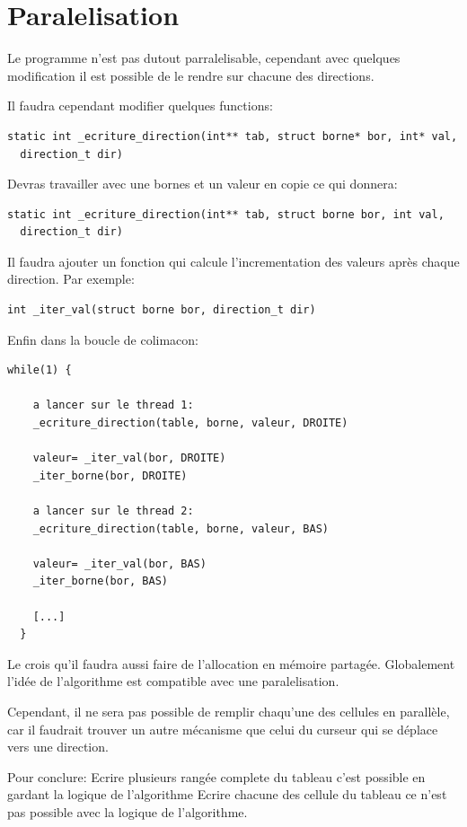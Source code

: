 \documentclass[a4paper]{article}
\begin{document}
\section{Paralelisation}

Le programme n'est pas dutout parralelisable, cependant avec quelques
modification il est possible de le rendre sur chacune des directions.

Il faudra cependant modifier quelques functions:
\begin{lstlisting}[frame=single]
static int _ecriture_direction(int** tab, struct borne* bor, int* val,
  direction_t dir)
\end{lstlisting}
Devras travailler avec une bornes et un valeur en copie ce qui donnera:
\begin{lstlisting}[frame=single]
static int _ecriture_direction(int** tab, struct borne bor, int val,
  direction_t dir)
\end{lstlisting}

Il faudra ajouter un fonction qui calcule l'incrementation des valeurs après
chaque direction. Par exemple:
\begin{lstlisting}[frame=single]
int _iter_val(struct borne bor, direction_t dir)
\end{lstlisting}

Enfin dans la boucle de colimacon:

\begin{lstlisting}[frame=single]
  while(1) {

    a lancer sur le thread 1:
    _ecriture_direction(table, borne, valeur, DROITE)

    valeur= _iter_val(bor, DROITE)
    _iter_borne(bor, DROITE)

    a lancer sur le thread 2:
    _ecriture_direction(table, borne, valeur, BAS)

    valeur= _iter_val(bor, BAS)
    _iter_borne(bor, BAS)

    [...]
  }
\end{lstlisting}

Le crois qu'il faudra aussi faire de l'allocation en mémoire partagée.
Globalement l'idée de l'algorithme est compatible avec une paralelisation.

Cependant, il ne sera pas possible de remplir chaqu'une des cellules en
parallèle, car il faudrait trouver un autre mécanisme que celui du curseur
qui se déplace vers une direction.

Pour conclure:
Ecrire plusieurs rangée complete du tableau c'est possible en
gardant la logique de l'algorithme
Ecrire chacune des cellule du tableau ce n'est pas possible avec la logique de
l'algorithme.
\end{document}
